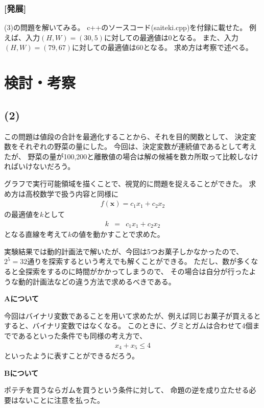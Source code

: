 \documentclass[12pt]{jarticle}
\begin{document}
\subsubsection*{[発展]}
(3)の問題を解いてみる。
c++のソースコード(saiteki.cpp)を付録に載せた。
例えば、入力$(H,W)=(30,5)$に対しての最適値は0となる。
また、入力$(H,W)=(79,67)$に対しての最適値は60となる。
求め方は考察で述べる。

\clearpage
\section{検討・考察}

\subsection*{(2)}
この問題は値段の合計を最適化することから、それを目的関数として、
決定変数をそれぞれの野菜の量にした。
今回は、決定変数が連続値であるとして考えたが、
野菜の量が100,200と離散値の場合は解の候補を数カ所取って比較しなければいけないだろう。

グラフで実行可能領域を描くことで、視覚的に問題を捉えることができた。
求め方は高校数学で扱う内容と同様に
\begin{eqnarray}
    f(\boldsymbol{x})=c_1x_1+c_2x_2\nonumber
\end{eqnarray}
の最適値を$k$として
\begin{eqnarray}
    k&=&c_1x_1+c_2x_2\nonumber
\end{eqnarray}
となる直線を考えて$k$の値を動かすことで求めた。

実験結果では動的計画法で解いたが、今回は5つお菓子しかなかったので、$2^5=32$通りを探索するという考えでも解くことができる。
ただし、数が多くなると全探索をするのに時間がかかってしまうので、
その場合は自分が行ったような動的計画法などの違う方法で求めるべきである。


\textbf{Aについて}

今回はバイナリ変数であることを用いて求めたが、例えば同じお菓子が買えるとすると、バイナリ変数ではなくなる。
このときに、グミとガムは合わせて4個までであるといった条件でも同様の考え方で、
\begin{eqnarray}
    x_4+x_5\leq4\nonumber
\end{eqnarray}
といったように表すことができるだろう。

\textbf{Bについて}

ポテチを買うならガムを買うという条件に対して、
命題の逆を成り立たせる必要はないことに注意を払った。
\end{document}
